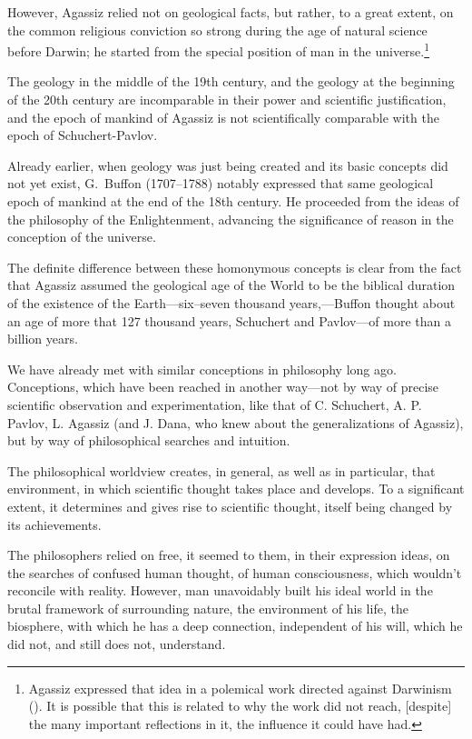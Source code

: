 However, Agassiz relied not on geological facts, but rather, to a great extent,
on the common religious conviction so strong during the age of natural science
before Darwin; he started from the special position of man in the
universe.\footnote{Agassiz expressed that idea in a polemical work directed
against Darwinism ().  It is possible that this is
related to why the work did not reach, [despite] the many important reflections
in it, the influence it could have had.}

The geology in the middle of the 19th century, and the geology at the beginning
of the 20th century are incomparable in their power and scientific
justification, and the epoch of mankind of Agassiz is not scientifically
comparable with the epoch of Schuchert-Pavlov.

Already earlier, when geology was just being created and its basic concepts did
not yet exist, G.\ Buffon (1707--1788) notably expressed that same geological
epoch of mankind at the end of the 18th century.  He proceeded from the ideas
of the philosophy of the Enlightenment, advancing the significance of reason in
the conception of the universe.

The definite difference between these homonymous concepts is clear from the
fact that Agassiz assumed the geological age of the World to be the biblical
duration of the existence of the Earth---six--seven thousand years,---Buffon
thought about an age of more that 127 thousand years, Schuchert and Pavlov---of
more than a billion years.


\Section %
We have already met with similar conceptions in philosophy long ago.
Conceptions, which have been reached in another way---not by way of precise
scientific observation and experimentation, like that of C. Schuchert, A. P.
Pavlov, L. Agassiz (and J. Dana, who knew about the generalizations of
Agassiz), but by way of philosophical searches and intuition.

The philosophical worldview creates, in general, as well as in particular, that
environment, in which scientific thought takes place and develops.  To a
significant extent, it determines and gives rise to scientific thought, itself
being changed by its achievements.

The philosophers relied on free, it seemed to them, in their expression ideas,
on the searches of confused human thought, of human consciousness, which
wouldn't reconcile with reality.  However, man unavoidably built his ideal
world in the brutal framework of surrounding nature, the environment of his
life, the biosphere, with which he has a deep connection, independent of his
will, which he did not, and still does not, understand.

